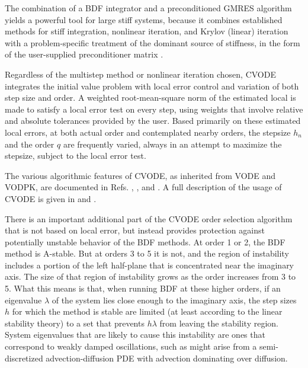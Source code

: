 The combination of a BDF integrator and a preconditioned GMRES
algorithm yields a powerful tool for large stiff systems, because it
combines established methods for stiff integration, nonlinear
iteration, and Krylov (linear) iteration with a problem-specific
treatment of the dominant source of stiffness, in the form of the
user-supplied preconditioner matrix \cite{BrHi:89}.

Regardless of the multistep method or nonlinear iteration chosen,
CVODE integrates the initial value problem with local error control
and variation of both step size and order.  A weighted root-mean-square
norm of the estimated local is made to satisfy a local error test on
every step, using weights that involve relative and absolute
tolerances provided by the user.  Based primarily on these estimated
local errors, at both actual order and contemplated nearby orders, the
stepsize $h_n$ and the order $q$ are frequently varied, always in an
attempt to maximize the stepsize, subject to the local error test.

The various algorithmic features of CVODE, as inherited from VODE and
VODPK, are documented in Refs. \cite{BBH:89}, \cite{Byr:92}, and
\cite{Hin:00}.  A full description of the usage of CVODE is given in
\cite{CoHi:94} and \cite{ByHi:98}.

There is an important additional part of the CVODE order selection
algorithm that is not based on local error, but instead provides
protection against potentially unstable behavior of the BDF methods.
At order 1 or 2, the BDF method is A-stable.  But at orders 3 to 5 it
is not, and the region of instability includes a portion of the left
half-plane that is concentrated near the imaginary axis.  The size of
that region of instability grows as the order increases from 3 to 5.
What this means is that, when running BDF at these higher orders, if
an eigenvalue $\lambda$ of the system lies close enough to the
imaginary axis, the step sizes $h$ for which the method is stable are
limited (at least according to the linear stability theory) to a set
that prevents $h\lambda$ from leaving the stability region.  System
eigenvalues that are likely to cause this instability are ones that
correspond to weakly damped oscillations, such as might arise from a
semi-discretized advection-diffusion PDE with advection dominating
over diffusion.


